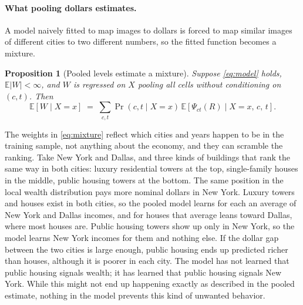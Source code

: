 \documentclass[11pt]{article}
\newtheorem{proposition}{Proposition}
\theoremstyle{remark}
\newcommand{\E}{\mathbb{E}}
\begin{document}
\paragraph{What pooling dollars estimates.} A model naively fitted to map images to
dollars is forced to map similar images of different cities to two different numbers, so the fitted function becomes a mixture.

\begin{proposition}[Pooled levels estimate a mixture]\label{prop:mixture}
Suppose \eqref{eq:model} holds, $\E|W| < \infty$, and $W$ is regressed on $X$ pooling all cells
without conditioning on $(c,t)$. Then
\begin{equation}\label{eq:mixture}
    \E\!\left[W \mid X=x\right]
    \;=\; \sum_{c,t} \Pr\!\left(c,t \mid X=x\right)\,
    \E\!\left[\Psi_{ct}(R) \mid X=x,\, c,\, t\right].
\end{equation}
\end{proposition}

The weights in \eqref{eq:mixture} reflect which cities and years happen to be in the training sample, not anything about the economy, and they can scramble the ranking. Take New York and Dallas, and three kinds of buildings that rank the same way in both cities: luxury residential towers at the top, single-family houses in the middle, public housing towers at the bottom. The same position in the local wealth distribution pays more nominal dollars in New York. Luxury towers and houses exist in both cities, so the pooled model learns for each an average of New York and Dallas incomes, and for houses that average leans toward Dallas, where most houses are. Public housing towers show up only in New York, so the model learns New York incomes for them and nothing else. If the dollar gap between the two cities is large enough, public housing ends up predicted richer than houses, although it is poorer in each city. The model has not learned that public housing signals wealth; it has learned that public housing signals New York. While this might not end up happening exactly as described in the pooled estimate, nothing in the model prevents this kind of unwanted behavior.
\end{document}
